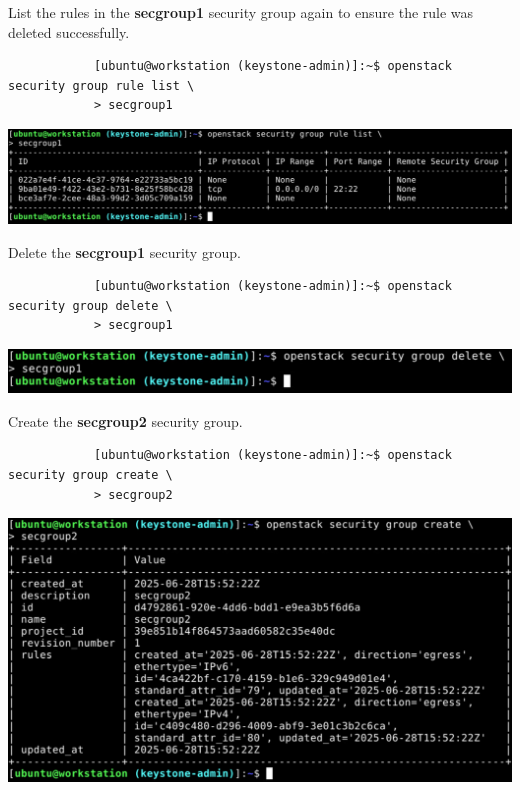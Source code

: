 \documentclass[letterpaper, 12pt]{article}
\begin{document}
\begin{enumerate}
    \begin{labstep}
        List the rules in the \textbf{secgroup1} security group again to ensure the rule was deleted successfully.
        \begin{lstlisting}
            [ubuntu@workstation (keystone-admin)]:~$ openstack security group rule list \
            > secgroup1
        \end{lstlisting}

        \begin{center}
            \includegraphics[width=\linewidth]{images/part5/step13.png}
        \end{center}
    \end{labstep}

    \begin{labstep}
        Delete the \textbf{secgroup1} security group.
        \begin{lstlisting}
            [ubuntu@workstation (keystone-admin)]:~$ openstack security group delete \
            > secgroup1
        \end{lstlisting}

        \begin{center}
            \includegraphics[width=\linewidth]{images/part5/step14.png}
        \end{center}
    \end{labstep}

    \begin{labstep}
        Create the \textbf{secgroup2} security group.
        \begin{lstlisting}
            [ubuntu@workstation (keystone-admin)]:~$ openstack security group create \
            > secgroup2
        \end{lstlisting}

        \begin{center}
            \includegraphics[width=\linewidth]{images/part5/step15.png}
        \end{center}
    \end{labstep}


\end{enumerate}
\end{document}
